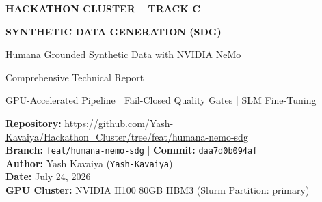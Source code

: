 \documentclass[11pt,a4paper]{article}
\begin{document}
\begin{titlepage}
    \centering
    \vspace*{2cm}
    
    
    \vspace{1.5cm}
    
    {\huge\bfseries\color{nvidiaWhite} HACKATHON CLUSTER -- TRACK C\par}
    \vspace{0.5cm}
    {\LARGE\bfseries\color{nvidiaGreen} SYNTHETIC DATA GENERATION (SDG)\par}
    \vspace{0.3cm}
    {\Large\color{nvidiaBlue} Humana Grounded Synthetic Data with NVIDIA NeMo\par}
    
    \vspace{2cm}
    
    {\large\color{nvidiaWhite} Comprehensive Technical Report\par}
    {\large\color{nvidiaWhite} GPU-Accelerated Pipeline | Fail-Closed Quality Gates | SLM Fine-Tuning\par}
    
    \vspace{2cm}
    
    \begin{tcolorbox}[
        colback=nvidiaDarkGray,
        colframe=nvidiaGreen,
        width=0.8\linewidth,
        arc=5pt,
        boxrule=1.5pt
    ]
    \centering
    {\color{nvidiaWhite}\Large\textbf{Repository:} \url{https://github.com/Yash-Kavaiya/Hackathon_Cluster/tree/feat/humana-nemo-sdg}}\\
    \vspace{0.3cm}
    {\color{nvidiaWhite}\textbf{Branch:} \texttt{feat/humana-nemo-sdg} | \textbf{Commit:} \texttt{daa7d0b094af}}\\
    \vspace{0.3cm}
    {\color{nvidiaWhite}\textbf{Author:} Yash Kavaiya (\texttt{Yash-Kavaiya})}\\
    \vspace{0.3cm}
    {\color{nvidiaWhite}\textbf{Date:} July 24, 2026}\\
    \vspace{0.3cm}
    {\color{nvidiaWhite}\textbf{GPU Cluster:} NVIDIA H100 80GB HBM3 (Slurm Partition: primary)}
    \end{tcolorbox}
    

\end{titlepage}
\end{document}
